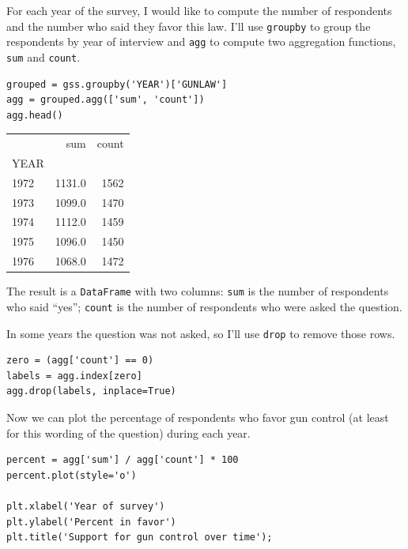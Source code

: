 For each year of the survey, I would like to compute the number of
respondents and the number who said they favor this law. I'll use
\passthrough{\lstinline!groupby!} to group the respondents by year of
interview and \passthrough{\lstinline!agg!} to compute two aggregation
functions, \passthrough{\lstinline!sum!} and
\passthrough{\lstinline!count!}.

\begin{lstlisting}[]
grouped = gss.groupby('YEAR')['GUNLAW']
agg = grouped.agg(['sum', 'count'])
agg.head()
\end{lstlisting}

\begin{tabular}{lrr}
\midrule
{} &     sum &  count \\
YEAR &         &        \\
\midrule
1972 &  1131.0 &   1562 \\
1973 &  1099.0 &   1470 \\
1974 &  1112.0 &   1459 \\
1975 &  1096.0 &   1450 \\
1976 &  1068.0 &   1472 \\
\midrule
\end{tabular}

The result is a \passthrough{\lstinline!DataFrame!} with two columns:
\passthrough{\lstinline!sum!} is the number of respondents who said
``yes''; \passthrough{\lstinline!count!} is the number of respondents
who were asked the question.

In some years the question was not asked, so I'll use
\passthrough{\lstinline!drop!} to remove those rows.

\begin{lstlisting}[]
zero = (agg['count'] == 0)
labels = agg.index[zero]
agg.drop(labels, inplace=True)
\end{lstlisting}

Now we can plot the percentage of respondents who favor gun control (at
least for this wording of the question) during each year.

\begin{lstlisting}[]
percent = agg['sum'] / agg['count'] * 100
percent.plot(style='o')

plt.xlabel('Year of survey')
plt.ylabel('Percent in favor')
plt.title('Support for gun control over time');
\end{lstlisting}

